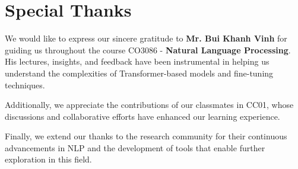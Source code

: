 \section{Special Thanks}

We would like to express our sincere gratitude to \textbf{Mr. Bui Khanh Vinh} for guiding us throughout the course CO3086 - \textbf{Natural Language Processing}. His lectures, insights, and feedback have been instrumental in helping us understand the complexities of Transformer-based models and fine-tuning techniques.

Additionally, we appreciate the contributions of our classmates in CC01, whose discussions and collaborative efforts have enhanced our learning experience. 

Finally, we extend our thanks to the research community for their continuous advancements in NLP and the development of tools that enable further exploration in this field.
